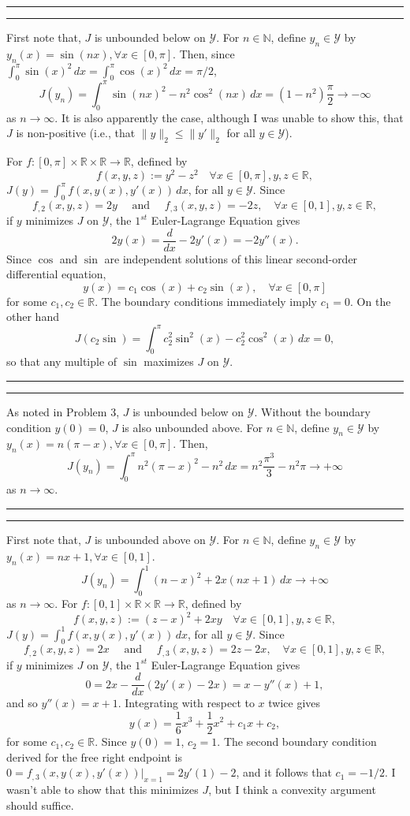 \documentclass[11pt]{article}
\newcounter{questionCounter}
\newcounter{partCounter}[questionCounter]
\newenvironment{question}[2][\arabic{questionCounter}]{%
    \setcounter{partCounter}{0}%
    \vspace{.25in} \hrule \vspace{0.5em}%
        \noindent{\bf #2}%
    \vspace{0.8em} \hrule \vspace{.10in}%
    \addtocounter{questionCounter}{1}%
}{}
\newcommand{\N}{\mathbb{N}}             %
\newcommand{\R}{\mathbb{R}}             %
\newcommand{\Y}{\mathscr{Y}}            %
\begin{document}
\newpage
\begin{question}{Problem 3}
First note that, $J$ is unbounded below on $\Y$. For $n \in \N$, define
$y_n \in \Y$ by $y_n(x) = \sin(nx), \forall x \in [0,\pi]$. Then, since
$\int_0^\pi \sin(x)^2 \, dx = \int_0^\pi \cos(x)^2 \, dx = \pi/2$,
\[J(y_n)
    = \int_0^\pi \sin(nx)^2 - n^2 \cos^2(nx) \, dx
    = (1 - n^2) \frac{\pi}{2} \to -\infty
\]
as $n \to \infty$. It is also apparently the case, although I was unable to
show this, that $J$ is non-positive (i.e., that $\|y\|_2 \leq \|y'\|_2$ for all
$y \in \Y$).

For $f : [0,\pi] \times \R \times \R \to \R$, defined by
\[f(x,y,z) := y^2 - z^2 \quad \forall x \in [0,\pi], y,z \in \R,\]
$J(y) = \int_0^\pi f(x,y(x),y'(x)) \, dx$, for all $y \in \Y$.
Since
\[f_{,2}(x,y,z)
    = 2y
\quad \mbox{ and } \quad
f_{,3}(x,y,z)
    = -2z, \quad \forall x \in [0,1], y,z \in \R,
\]
if $y$ minimizes $J$ on $\Y$, the $1^{st}$ Euler-Lagrange Equation gives
\[2y(x)
    = \frac{d}{dx} - 2y'(x)
    = -2y''(x).
\]
Since $\cos$ and $\sin$ are independent solutions of this linear second-order
differential equation,
\[y(x) = c_1 \cos(x) + c_2 \sin(x), \quad \forall x \in [0,\pi]\]
for some $c_1,c_2 \in \R$. The boundary conditions immediately imply $c_1 = 0$.
On the other hand
\[J(c_2 \sin)
    = \int_0^\pi c_2^2 \sin^2(x) - c_2^2 \cos^2(x) \, dx
    = 0,
\]
so that any multiple of $\sin$ maximizes $J$ on $\Y$.
\end{question}

\begin{question}{Problem 4}
As noted in Problem 3, $J$ is unbounded below on $\Y$. Without the boundary
condition $y(0) = 0$, $J$ is also unbounded above. For $n \in \N$, define
$y_n \in \Y$ by $y_n(x) = n(\pi - x), \forall x \in [0,\pi]$. Then,
\[J(y_n)
    = \int_0^\pi n^2 (\pi - x)^2 - n^2 \, dx
    = n^2 \frac{\pi^3}{3} - n^2\pi \to +\infty
\]
as $n \to \infty$.
\end{question}

\newpage
\begin{question}{Problem 5}
First note that, $J$ is unbounded above on $\Y$. For $n \in \N$, define
$y_n \in \Y$ by $y_n(x) = nx + 1, \forall x \in [0,1]$.
\[J(y_n)
    = \int_0^1 (n - x)^2 + 2x(nx + 1) \, dx \to +\infty
\]
as $n \to \infty$. For $f : [0,1] \times \R \times \R \to \R$, defined by
\[f(x,y,z) := (z - x)^2 + 2xy \quad \forall x \in [0,1], y,z \in \R,\]
$J(y) = \int_0^1 f(x,y(x),y'(x)) \, dx$, for all $y \in \Y$.
Since
\[f_{,2}(x,y,z)
    = 2x
\quad \mbox{ and } \quad
f_{,3}(x,y,z)
    = 2z - 2x, \quad \forall x \in [0,1], y,z \in \R,
\]
if $y$ minimizes $J$ on $\Y$, the $1^{st}$ Euler-Lagrange Equation gives
\[0
    = 2x - \frac{d}{dx} (2y'(x) - 2x)
    = x - y''(x) + 1,
\]
and so $y''(x) = x + 1$. Integrating with respect to $x$ twice gives
\[y(x) = \frac16 x^3 + \frac12 x^2 + c_1 x + c_2,\]
for some $c_1,c_2 \in \R$. Since $y(0) = 1$, $c_2 = 1$. The second boundary
condition derived for the free right endpoint is
$0 = f_{,3}(x,y(x),y'(x)) \big|_{x = 1} = 2y'(1) - 2$, and it follows that
$c_1 = -1/2$.
I wasn't able to show that this minimizes $J$, but I think a convexity argument
should suffice.
\end{question}
\end{document}
